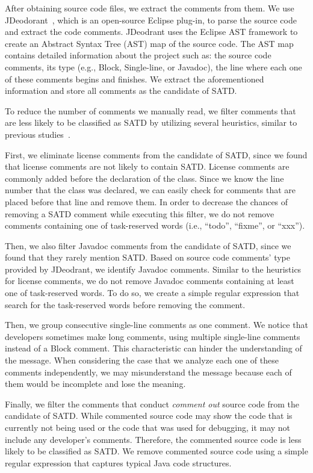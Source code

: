 After obtaining source code files, we extract the comments from them. We use JDeodorant~\cite{Tsantalis2008CSMR}, which is an open-source Eclipse plug-in, to parse the source code and extract the code comments. JDeodrant uses the Eclipse AST framework to create an Abstract Syntax Tree (AST) map of the source code. The AST map contains detailed information about the project such as: the source code comments, its type (e.g., Block, Single-line, or Javadoc), the line where each one of these comments begins and finishes. We extract the aforementioned information and store all comments as the candidate of SATD.

To reduce the number of comments we manually read, we filter comments that are less likely to be classified as SATD by utilizing several heuristics, similar to previous studies~\cite{Maldonado2015MTD}.

First, we eliminate license comments from the candidate of SATD, since we found that license comments are not likely to contain SATD. License comments are commonly added before the declaration of the class. Since we know the line number that the class was declared, we can easily check for comments that are placed before that line and remove them. In order to decrease the chances of removing a SATD comment while executing this filter, we do not remove comments containing one of task-reserved words (i.e., “todo”, “fixme”, or “xxx”).

Then, we also filter Javadoc comments from the candidate of SATD, since we found that they rarely mention SATD. Based on source code comments' type provided by JDeodrant, we identify Javadoc comments. Similar to the heuristics for license comments, we do not remove Javadoc comments containing at least one of task-reserved words. To do so, we create a simple regular expression that search for the task-reserved words before removing the comment.

Then, we group consecutive single-line comments as one comment. We notice that developers sometimes make long comments, using multiple single-line comments instead of a Block comment. This characteristic can hinder the understanding of the message. When considering the case that we analyze each one of these comments independently, we may misunderstand the message because each of them would be incomplete and lose the meaning.

Finally, we filter the comments that conduct {\it comment out} source code from the candidate of SATD. While commented source code may show the code that is currently not being used or the code that was used for debugging, it may not include any developer's comments. Therefore, the commented source code is less likely to be classified as SATD. We remove commented source code using a simple regular expression that captures typical Java code structures.

